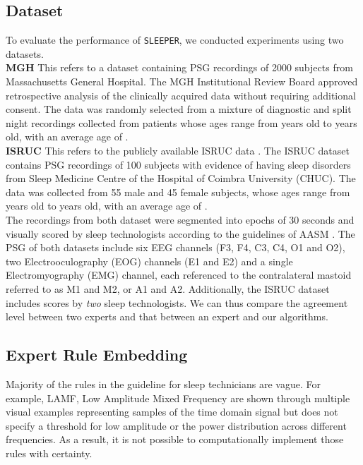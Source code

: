 \documentclass[pmlr]{jmlr}
\newcommand{\mname}
{\texttt{SLEEPER}\xspace}
\begin{document}
\subsection{Dataset}
To evaluate the performance of \mname, we conducted experiments using two datasets.\\

\noindent\textbf{MGH} This refers to a dataset containing PSG recordings of 2000 subjects from Massachusetts General Hospital. The MGH Institutional Review Board approved retrospective analysis of the clinically acquired data without requiring additional consent. The data was randomly selected from a mixture of diagnostic and split night recordings collected from patients whose ages range from  years old to  years old, with an average age of . \\

\noindent\textbf{ISRUC} This refers to the publicly available ISRUC data \citep{isruc}. The ISRUC dataset contains PSG recordings of 100 subjects with evidence of having sleep disorders from Sleep Medicine Centre of the Hospital of Coimbra University (CHUC). The data was collected from 55 male and 45 female subjects, whose ages range from  years old to  years old, with an average age of .\\


The recordings from both dataset were segmented into epochs of 30 seconds and visually scored by sleep technologists according to the guidelines of AASM \citep{berry2012aasm}. The PSG of both datasets include six EEG channels (F3, F4, C3, C4, O1 and O2), two Electrooculography (EOG) channels (E1 and E2) and a single Electromyography (EMG) channel, each referenced to the contralateral mastoid referred to as M1 and M2, or A1 and A2. Additionally, the ISRUC dataset includes scores by \textit{two} sleep technologists. We can thus compare the agreement level between two experts and that between an expert and our algorithms.



 


\subsection{Expert Rule Embedding} \label{sec:feature}
Majority of the rules in the guideline for sleep technicians \citep{berry2012aasm} are vague. For example, LAMF, Low Amplitude Mixed Frequency are shown through multiple visual examples representing samples of the time domain signal but does not specify a threshold for low amplitude or the power distribution across different frequencies. As a result, it is not possible to computationally implement those rules with certainty. 
\end{document}
